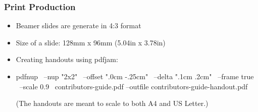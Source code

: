 \begin{slide}[fragile]
  \frametitle{Print Production}
  \begin{itemize}
    \item Beamer slides are generate in 4:3 format
    \item Size of a slide: 128mm x 96mm (5.04in x 3.78in)
    \item Creating handouts using pdfjam:
    \item[] \begin{shell}
pdfnup \
  --nup "2x2" \
  --offset ".0cm -.25cm" \
  --delta ".1cm .2cm" \
  --frame true \
  --scale 0.9 \
  contributors-guide.pdf --outfile contributors-guide-handout.pdf
    \end{shell}
    {\footnotesize (The handouts are meant to scale to both A4 and US Letter.)}
  \end{itemize}
\end{slide}
